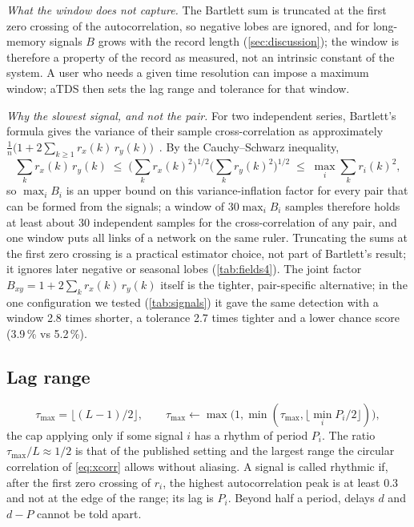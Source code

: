 \documentclass[11pt,a4paper]{article}
\begin{document}
\emph{What the window does not capture.} The Bartlett sum is truncated at the first zero crossing of the autocorrelation, so negative lobes are ignored, and for long-memory signals $B$ grows with the record length (\cref{sec:discussion}); the window is therefore a property of the record as measured, not an intrinsic constant of the system. A user who needs a given time resolution can impose a maximum window; aTDS then sets the lag range and tolerance for that window.

\emph{Why the slowest signal, and not the pair.} For two independent series, Bartlett's formula gives the variance of their sample cross-correlation as approximately $\frac{1}{n}\big(1 + 2\sum_{k\ge1} r_x(k)\,r_y(k)\big)$~\cite{Bartlett1946TheoreticalSpecification}. By the Cauchy--Schwarz inequality,
\begin{equation}
\textstyle\sum_k r_x(k)\,r_y(k) \;\le\; \big(\sum_k r_x(k)^2\big)^{1/2}\big(\sum_k r_y(k)^2\big)^{1/2} \;\le\; \max_i \sum_k r_i(k)^2 ,
\end{equation}
so $\max_i B_i$ is an upper bound on this variance-inflation factor for every pair that can be formed from the signals; a window of $30\max_i B_i$ samples therefore holds at least about 30 independent samples for the cross-correlation of any pair, and one window puts all links of a network on the same ruler. Truncating the sums at the first zero crossing is a practical estimator choice, not part of Bartlett's result; it ignores later negative or seasonal lobes (\cref{tab:fields4}). The joint factor $B_{xy} = 1 + 2\sum_k r_x(k)\,r_y(k)$ itself is the tighter, pair-specific alternative; in the one configuration we tested (\cref{tab:signals}) it gave the same detection with a window 2.8 times shorter, a tolerance 2.7 times tighter and a lower chance score (3.9\,\% vs 5.2\,\%).

\subsection{Lag range}
\label{sec:lag}
\begin{equation}
\tau_{\max} = \big\lfloor (L-1)/2 \big\rfloor, \qquad \tau_{\max} \leftarrow \max\!\big(1, \min(\tau_{\max}, \lfloor \min_i P_i / 2 \rfloor)\big),
\end{equation}
the cap applying only if some signal $i$ has a rhythm of period $P_i$.
The ratio $\tau_{\max} / L \approx 1/2$ is that of the published setting and the largest range the circular correlation of \cref{eq:xcorr} allows without aliasing. A signal is called rhythmic if, after the first zero crossing of $r_i$, the highest autocorrelation peak is at least 0.3 and not at the edge of the range; its lag is $P_i$. Beyond half a period, delays $d$ and $d - P$ cannot be told apart.
\end{document}
